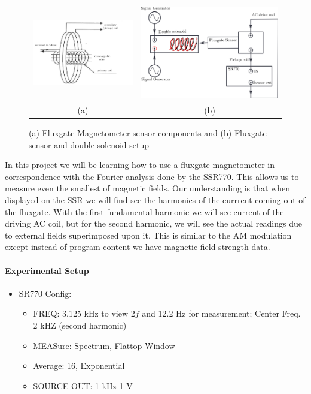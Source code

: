 \documentclass[../main.tex]{subfiles}
\begin{document}
\begin{figure}[ht]
    \centering
    \begin{tabular}{cc}
        \includegraphics[width=0.45\linewidth]{exp3_1.png} & \includegraphics[width=0.45\linewidth]{exp3_2.png} \\
        (a) & (b)
    \end{tabular}
    \caption{(a) Fluxgate Magnetometer sensor components and (b) Fluxgate sensor and double solenoid setup}
    \label{fig:exp3_combined}
\end{figure}
In this project we will be learning how to use a fluxgate magnetometer in correspondence with the Fourier analysis done by the SSR770. This allows us to measure even the smallest of magnetic fields. Our understanding is that when displayed on the SSR we will find see the harmonics of the currrent coming out of the fluxgate. With the first fundamental harmonic we will see current of the driving AC coil, but for the second harmonic, we will see the actual readings due to external fields superimposed upon it. This is similar to the AM modulation except instead of program content we have magnetic field strength data.

\paragraph{Experimental Setup}
\begin{itemize}
    \item SR770 Config:
    \begin{itemize}
        \item FREQ: 3.125 kHz to view $2f$ and 12.2 Hz for measurement; Center Freq. 2 kHZ (second harmonic)
        \item MEASure: Spectrum, Flattop Window
        \item Average: 16, Exponential
        \item SOURCE OUT: 1 kHz 1 V 
    \end{itemize}
\end{itemize}
\end{document}
